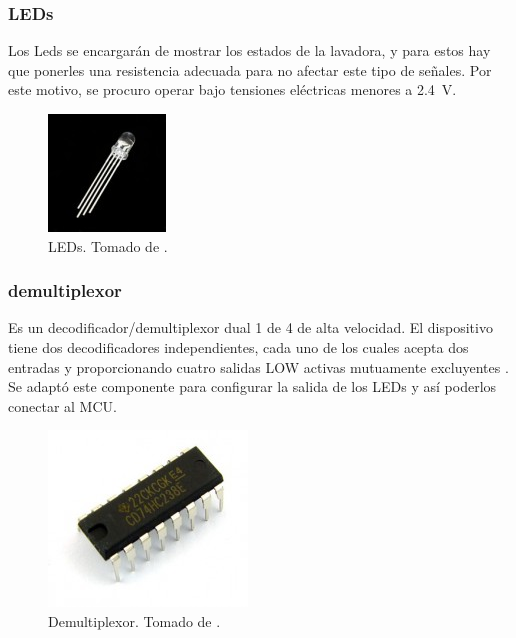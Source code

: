 \subsubsection*{LEDs}
Los Leds se encargarán de mostrar los estados de la lavadora, y para estos hay que ponerles una resistencia adecuada para no afectar este tipo de señales. Por este motivo, se procuro operar bajo tensiones eléctricas menores a \SI{2.4}{\volt}.
    \begin{figure}[H]
        \centering
        \includegraphics[width=.3\linewidth]{Imagenes/LED.jpg}
        \caption{LEDs. Tomado de \cite{web3}.}
        \label{LED}
    \end{figure}
    
\subsubsection*{demultiplexor}
Es un decodificador/demultiplexor dual 1 de 4 de alta velocidad. El dispositivo tiene dos decodificadores independientes, cada uno de los cuales acepta dos entradas y proporcionando cuatro salidas LOW activas mutuamente excluyentes \cite{web3}. Se adaptó este componente para configurar la salida de los LEDs y así poderlos conectar al MCU.
    \begin{figure}[H]
        \centering
        \includegraphics[width=.3\linewidth]{Imagenes/demux.jpg}
        \caption{Demultiplexor. Tomado de \cite{web3}.}
        \label{demux}
    \end{figure}
    
